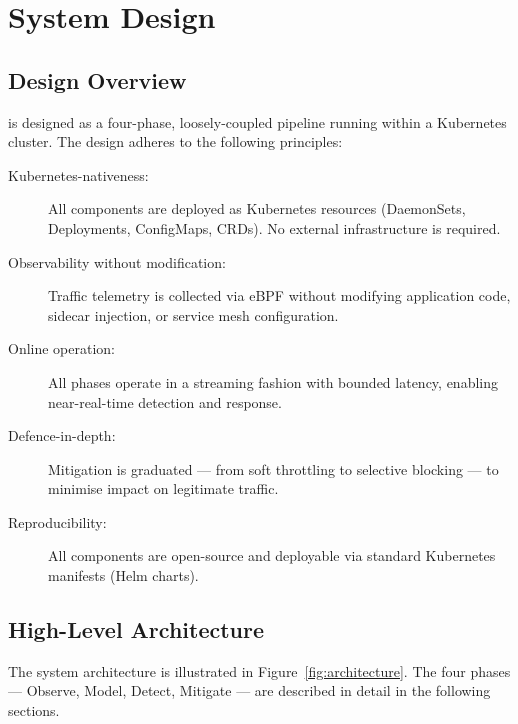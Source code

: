 \chapter{System Design}
\label{ch:design}

\section{Design Overview}
\label{sec:design_overview}

\sys{} is designed as a four-phase, loosely-coupled pipeline running within a Kubernetes
cluster. The design adheres to the following principles:

\begin{description}
  \item[Kubernetes-nativeness:] All components are deployed as Kubernetes resources
  (DaemonSets, Deployments, ConfigMaps, CRDs). No external infrastructure is required.

  \item[Observability without modification:] Traffic telemetry is collected via eBPF
  without modifying application code, sidecar injection, or service mesh configuration.

  \item[Online operation:] All phases operate in a streaming fashion with bounded
  latency, enabling near-real-time detection and response.

  \item[Defence-in-depth:] Mitigation is graduated --- from soft throttling to selective
  blocking --- to minimise impact on legitimate traffic.

  \item[Reproducibility:] All components are open-source and deployable via standard
  Kubernetes manifests (Helm charts).
\end{description}

\section{High-Level Architecture}
\label{sec:design_arch}

The system architecture is illustrated in Figure~\ref{fig:architecture}. The four phases
--- Observe, Model, Detect, Mitigate --- are described in detail in the following sections.

